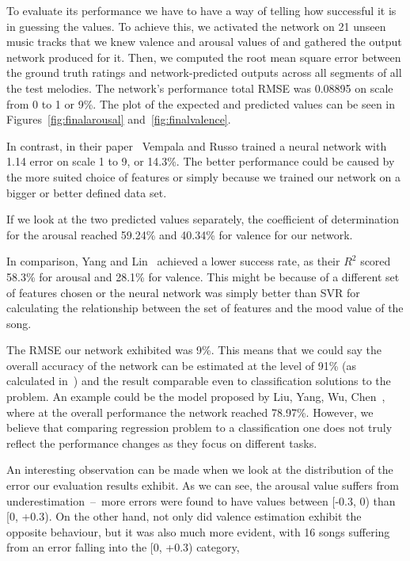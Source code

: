 To evaluate its performance we have to have a way of telling how successful it is in guessing the values. To achieve this, we activated the network on 21 unseen music tracks that we knew valence and arousal values of and gathered the output network produced for it. Then, we computed the root mean square error between the ground truth ratings and network-predicted outputs across all segments of all the test melodies. The network's performance total RMSE was 0.08895 on scale from 0 to 1 or 9\%. The plot of the expected and predicted values can be seen in Figures~\ref{fig:finalarousal} and~\ref{fig:finalvalence}.

In contrast, in their paper~\cite{vempala} Vempala and Russo trained a neural network with 1.14 error on scale 1 to 9, or 14.3\%. The better performance could be caused by the more suited choice of features or simply because we trained our network on a bigger or better defined data set.

If we look at the two predicted values separately, the coefficient of determination for the arousal reached 59.24\% and 40.34\% for valence for our network.

In comparison, Yang and Lin~\cite{mood} achieved a lower success rate, as their $R^2$ scored 58.3\% for arousal and 28.1\% for valence. This might be because of a different set of features chosen or the neural network was simply better than SVR for calculating the relationship between the set of features and the mood value of the song.

The RMSE our network exhibited was 9\%. This means that we could say the overall accuracy of the network can be estimated at the level of 91\% (as calculated in~\cite{vempala}) and the result comparable even to classification solutions to the problem. An example could be the model proposed by Liu, Yang, Wu, Chen~\cite{moodclass}, where at the overall performance the network reached 78.97\%. However, we believe that comparing regression problem to a classification one does not truly reflect the performance changes as they focus on different tasks. 

An interesting observation can be made when we look at the distribution of the error our evaluation results exhibit. As we can see, the arousal value suffers from underestimation~--~more errors were found to have values between [-0.3, 0) than [0, +0.3). On the other hand, not only did valence estimation exhibit the opposite behaviour, but it was also much more evident, with 16 songs suffering from an error falling into the [0, +0.3) category,



